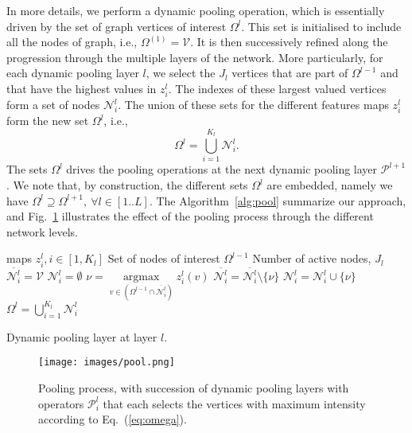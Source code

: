 \documentclass[10pt,journal,compsoc]{IEEEtran}
\begin{document}
	In more details, we perform a dynamic pooling operation, which is essentially driven by the set of graph vertices of interest $\Omega^{l}$. This set is initialised to include all the nodes of graph, i.e., $\Omega^{(1)}= \mathcal{V}$. It is then successively refined along the progression through the multiple layers of the network. More particularly, for each dynamic pooling layer $l$, we select the $J_l$ vertices that are part of $\Omega^{l-1}$ and that have the highest values in $z_i^{l}$. The indexes of these largest valued vertices form a set of nodes $\mathcal{N}_i^{l}$. The union of these sets for the different features maps $z_i^{l}$ form the new set $\Omega^{l}$, i.e., 
	\begin{equation}
	\Omega^{l} = \bigcup\limits_{i=1}^{K_{l}}\mathcal{N}_i^{l} .
	\label{eq:omega}
	\end{equation}
	The sets $\Omega^{l}$  drives the pooling operations at the next dynamic pooling layer $\mathcal{P}^{l+1}$. We note that, by construction, the different sets $\Omega^{l}$ are embedded, namely we have $\Omega^{l}  \supseteq \Omega^{l+1}, \ \forall l \in [1..L]$. The Algorithm~\ref{alg:pool} summarize our approach, and Fig.~\ref{fig:pool} illustrates the effect of the pooling process through the different network levels.
	
	\begin{algorithm}[h!]
		\begin{algorithmic}[1]
			\quad \Feature maps $z_i^{l}, i \in [1,K_l]$
			\STATE \qquad\quad\quad Set of nodes of interest $\Omega^{l-1}$
			\STATE \qquad\quad\quad Number of active nodes, $J_l$
			\vspace{5pt}
			\STATE $\overline{\mathcal{N}_i^{l}} = \mathcal{V}$
			\STATE $\mathcal{N}_i^{l} = \emptyset $
			\STATE $\nu =  \mathop{\arg\max} \limits_{v \in \left(\Omega^{l-1} \cap \overline{\mathcal{N}_i^{l}} \right)} z_i^{l}(v)$ 
			\STATE $\overline{\mathcal{N}_i^{l}} = \overline{\mathcal{N}_i^{l}} \setminus \{\nu\}$
			\STATE $\mathcal{N}_i^{l} = \mathcal{N}_i^{l} \cup \{\nu\}$
			\ENDFOR
			\ENDFOR
			\STATE $\Omega^{l}=\bigcup\limits_{i=1}^{K_{l}}\mathcal{N}_i^{l}$
		\end{algorithmic}
		\caption{Dynamic pooling layer at layer $l$.}
		\label{alg:pool}
	\end{algorithm}
	
	
	\begin{figure}[!t]
		\centering
		\texttt{[image: images/pool.png]} 
		\caption{Pooling process, with succession of dynamic pooling layers with operators $\mathcal{P}_i^{l}$ that each selects the vertices with maximum intensity according to Eq.~(\ref{eq:omega}).
		}
		\label{fig:pool}
	\end{figure}
	
\end{document}
